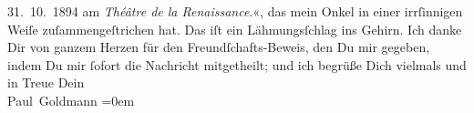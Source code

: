 \begin{ledgroupsized}[t]{13cm}
{{{                     31. 10. 1894 am \emph{Théâtre de la
                     Renaissance}.}}}\label{K_L02618-5h}«, das mein Onkel in einer irrſinnigen Weiſe zuſammengeſtrichen hat.
               Das iſt ein Lähmungsſchlag ins Gehirn.\pend
           \pstart
           Ich danke Dir von ganzem Herzen für den Freundſchafts-Beweis, den Du mir gegeben,
               indem Du mir ſofort die {\pb}Nachricht mitgetheilt; und
               ich begrüße Dich vielmals und in Treue\pend
           \pstart
           Dein {\\[\baselineskip]}\spacefill\mbox{Paul Goldmann}\pend
           \leftskip=0em{}
         
         \endnumbering{}\end{ledgroupsized}  \newcommand{\dateiname}{L02618}\newcommand{\titel}{Paul Goldmann an Arthur Schnitzler, 3. 11. [1894]}\newcommand{\editorInnen}{Martin Anton Müller und Laura Untner}
      